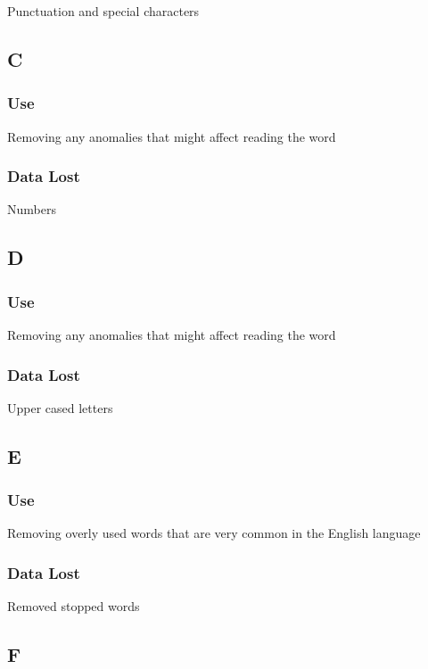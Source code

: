 \documentclass{article}
\begin{document}
Punctuation and special characters

\subsection{C}

\subsubsection{Use}

Removing any anomalies that might affect reading the word

\subsubsection{Data Lost}

Numbers

\subsection{D}

\subsubsection{Use}

Removing any anomalies that might affect reading the word

\subsubsection{Data Lost}

Upper cased letters

\subsection{E}

\subsubsection{Use}

Removing overly used words that are very common in the English language

\subsubsection{Data Lost}

Removed stopped words

\subsection{F}
\end{document}

